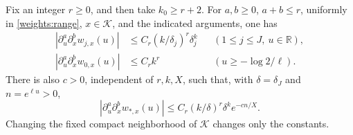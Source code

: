 \begin{lemma}
\label{weights:derivatives}
Fix an integer \(r\ge0\), and then take \(k_0\ge r+2\).
For \(a,b\ge0\), \(a+b\le r\), uniformly in \eqref{weights:range},
\(x\in\mathcal K\), and the indicated arguments, one has
\begin{align}
 |\partial_u^a\partial_x^b w_{j,x}(u)|
   &\le C_r(k/\delta_j)^r\delta_j^k
                  &&(1\le j\le J,\ u\in\mathbb R), \label{weights:short-derivatives}\\
 |\partial_u^a\partial_x^b w_{0,x}(u)|
   &\le C_r k^r
                  &&(u\ge-\log2/\ell). \label{weights:main-derivatives}
\end{align}
There is also \(c>0\), independent of \(r,k,X\), such that, with
\(\delta=\delta_J\) and \(n=e^{\ell u}>0\),
\begin{equation}
 |\partial_u^a\partial_x^b w_{*,x}(u)|
       \le C_r(k/\delta)^r\delta^k e^{-cn/X}.
 \label{weights:terminal-derivatives}
\end{equation}
Changing the fixed compact neighborhood of \(\mathcal K\) changes
only the constants.
\end{lemma}

